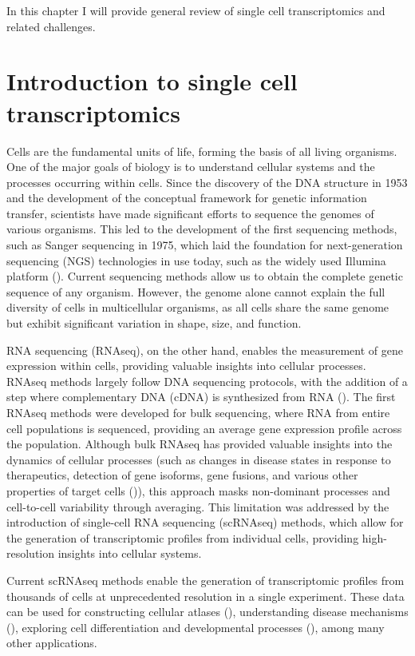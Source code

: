 In this chapter I will provide general review of single cell transcriptomics and related challenges.

\section{Introduction to single cell transcriptomics}

Cells are the fundamental units of life, forming the basis of all living organisms.
One of the major goals of biology is to understand cellular systems and the processes occurring within cells.
Since the discovery of the DNA structure in 1953
and the development of the conceptual framework for genetic information transfer,
scientists have made significant efforts to sequence the genomes of various organisms.
This led to the development of the first sequencing methods, such as Sanger sequencing in 1975,
which laid the foundation for next-generation sequencing (NGS) technologies in use today,
such as the widely used Illumina platform (\cite{Heather2016}).
Current sequencing methods allow us to obtain the complete genetic sequence of any organism.
However, the genome alone cannot explain the full diversity of cells in multicellular organisms,
as all cells share the same genome but exhibit significant variation in shape, size, and function.

RNA sequencing (RNAseq), on the other hand, enables the measurement of gene expression within cells,
providing valuable insights into cellular processes.
RNAseq methods largely follow DNA sequencing protocols,
with the addition of a step where complementary DNA (cDNA) is synthesized from RNA (\cite{Heumos2023}).
The first RNAseq methods were developed for bulk sequencing, where RNA from entire cell populations is sequenced,
providing an average gene expression profile across the population.
Although bulk RNAseq has provided valuable insights into the dynamics of cellular processes
(such as changes in disease states in response to therapeutics, detection of gene isoforms, gene fusions,
and various other properties of target cells (\cite{Heumos2023})),
this approach masks non-dominant processes and cell-to-cell variability through averaging.
This limitation was addressed by the introduction of single-cell RNA sequencing (scRNAseq) methods,
which allow for the generation of transcriptomic profiles from individual cells,
providing high-resolution insights into cellular systems.

Current scRNAseq methods enable the generation of transcriptomic profiles from thousands of cells
at unprecedented resolution in a single experiment.
These data can be used for constructing cellular atlases (\cite{Rozenblatt2017}),
understanding disease mechanisms (\cite{Zhang2024}),
exploring cell differentiation and developmental processes (\cite{Skinner2024}), among many other applications.

